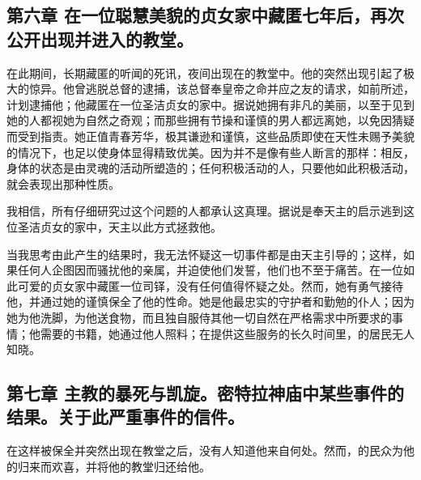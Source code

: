 
\subsection{第六章 在一位聪慧美貌的贞女家中藏匿七年后，再次公开出现并进入的教堂。}

在此期间，长期藏匿的听闻的死讯，夜间出现在的教堂中。他的突然出现引起了极大的惊异。他曾逃脱总督的逮捕，该总督奉皇帝之命并应之友的请求，如前所述，计划逮捕他；他藏匿在一位圣洁贞女的家中。据说她拥有非凡的美丽，以至于见到她的人都视她为自然之奇观；而那些拥有节操和谨慎的男人都远离她，以免因猜疑而受到指责。她正值青春芳华，极其谦逊和谨慎，这些品质即使在天性未赐予美貌的情况下，也足以使身体显得精致优美。因为并不是像有些人断言的那样：相反，身体的状态是由灵魂的活动所塑造的；任何积极活动的人，只要他如此积极活动，就会表现出那种性质。\par

我相信，所有仔细研究过这个问题的人都承认这真理。据说是奉天主的启示逃到这位圣洁贞女的家中，天主以此方式拯救他。\par

当我思考由此产生的结果时，我无法怀疑这一切事件都是由天主引导的；这样，如果任何人企图因而骚扰他的亲属，并迫使他们发誓，他们也不至于痛苦。在一位如此可爱的贞女家中藏匿一位司铎，没有任何值得怀疑之处。然而，她有勇气接待他，并通过她的谨慎保全了他的性命。她是他最忠实的守护者和勤勉的仆人；因为她为他洗脚，为他送食物，而且独自服侍其他一切自然在严格需求中所要求的事情；他需要的书籍，她通过他人照料；在提供这些服务的长久时间里，的居民无人知晓。\par


\subsection{第七章 主教的暴死与凯旋。密特拉神庙中某些事件的结果。关于此严重事件的信件。}

在这样被保全并突然出现在教堂之后，没有人知道他来自何处。然而，的民众为他的归来而欢喜，并将他的教堂归还给他。\par

